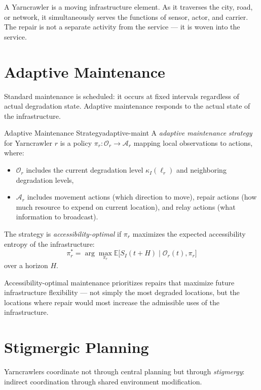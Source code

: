 A Yarncrawler is a moving infrastructure element. As it traverses
the city, road, or network, it simultaneously serves the functions of
sensor, actor, and carrier. The repair is not a separate activity from
the service — it is woven into the service.

\section{Adaptive Maintenance}

Standard maintenance is scheduled: it occurs at fixed intervals regardless
of actual degradation state. Adaptive maintenance responds to the actual
state of the infrastructure.

\begin{definition}{Adaptive Maintenance Strategy}{adaptive-maint}
  A \emph{adaptive maintenance strategy} for Yarncrawler $r$ is a
  policy $\pi_r : \mathcal{O}_r \to \mathcal{A}_r$ mapping local
  observations to actions, where:
  \begin{itemize}
    \item $\mathcal{O}_r$ includes the current degradation level
          $\kappa_I(\ell_r)$ and neighboring degradation levels,
    \item $\mathcal{A}_r$ includes movement actions (which direction
          to move), repair actions (how much resource to expend on
          current location), and relay actions (what information to
          broadcast).
  \end{itemize}
  The strategy is \emph{accessibility-optimal} if $\pi_r$ maximizes
  the expected accessibility entropy of the infrastructure:
  \[
    \pi_r^* = \arg\max_{\pi_r} \mathbb{E}\bigl[S_I(t+H) \mid
    \mathcal{O}_r(t), \pi_r\bigr]
  \]
  over a horizon $H$.
\end{definition}

Accessibility-optimal maintenance prioritizes repairs that maximize
future infrastructure flexibility — not simply the most degraded
locations, but the locations where repair would most increase the
admissible uses of the infrastructure.

\section{Stigmergic Planning}

Yarncrawlers coordinate not through central planning but through
\emph{stigmergy}: indirect coordination through shared environment
modification.

